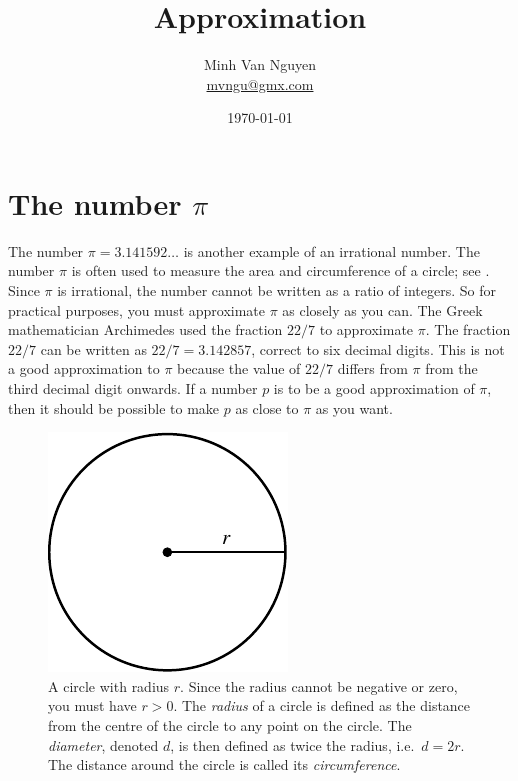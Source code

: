 \documentclass[a4paper,oneside,12pt]{article}
\begin{document}
\title{\Large\bf Approximation}
\author{%
  Minh Van Nguyen \\
  \url{mvngu@gmx.com}
}
\date{\today}
\maketitle


\section{The number $\pi$}

The number $\pi = 3.141592\dots$ is another example of an irrational
number.  The number $\pi$ is often used to measure the area and
circumference of a circle; see .  Since
$\pi$ is irrational, the number cannot be written as a ratio of
integers.  So for practical purposes, you must approximate $\pi$ as
closely as you can.  The Greek mathematician Archimedes used the
fraction $22 / 7$ to approximate $\pi$.  The fraction $22 / 7$ can be
written as $22 / 7 = 3.142857$, correct to six decimal digits.  This
is not a good approximation to $\pi$ because the value of $22 / 7$
differs from $\pi$ from the third decimal digit onwards.  If a number
$p$ is to be a good approximation of $\pi$, then it should be
possible to make $p$ as close to $\pi$ as you want.

\begin{figure}[!htbp]
\centering
\includegraphics[scale=1]{image/03/circle.pdf}
\caption{%
  A circle with radius $r$.  Since the radius cannot be negative or
  zero, you must have $r > 0$.  The \emph{radius} of a circle is
  defined as the distance from the centre of the circle to any point
  on the circle.  The \emph{diameter}, denoted $d$, is then defined as
  twice the radius, i.e.~$d = 2r$.  The distance around the circle is
  called its \emph{circumference}.
}
\label{fig:general_circle}
\end{figure}
\end{document}
